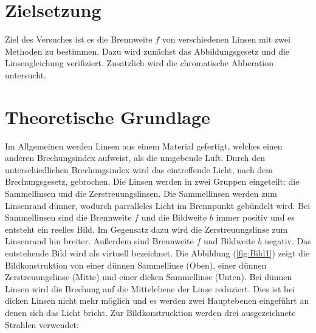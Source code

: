 \section{Zielsetzung}
Ziel des Versuches ist es die Brennweite $f$ von verschiedenen Linsen mit zwei Methoden zu bestimmen. Dazu wird zunächst das Abbildungsgesetz und die Linsengleichung verifiziert. Zusätzlich wird die chromatische Abberation untersucht.

\section{Theoretische Grundlage}
\begin{minipage}[T]{0.5\textwidth}
Im Allgemeinen werden Linsen aus einem Material gefertigt, welches einen anderen Brechungsindex aufweist, als die umgebende Luft. Durch den unterschiedlichen Brechungsindex wird das eintreffende Licht, nach dem Brechungsgesetz, gebrochen. Die Linsen werden in zwei Gruppen eingeteilt: die Sammellinsen und die Zerstreuungslinsen. Die Sammellinsen werden zum Linsenrand dünner, wodurch parralleles Licht im Brennpunkt gebündelt wird. Bei Sammellinsen sind die Brennweite $f$ und die Bildweite $b$ immer positiv und es entsteht ein reelles Bild. Im Gegensatz dazu wird die Zerstreuungslinse zum Linsenrand hin breiter. Außerdem sind Brennweite $f$ und Bildweite $b$ negativ. Das entstehende Bild wird als virtuell bezeichnet. Die Abbildung (\ref{fig:Bild1}) zeigt die Bildkonstruktion von einer dünnen Sammellinse (Oben), einer dünnen Zerstreuungslinse (Mitte) und einer dicken Sammellinse (Unten). Bei dünnen Linsen wird die Brechung auf die Mittelebene der Linse reduziert. Dies ist bei dicken Linsen nicht mehr möglich und es werden zwei Hauptebenen eingeführt an denen sich das Licht bricht. Zur Bildkonstrucktion werden drei ausgezeichnete Strahlen verwendet:
\end{minipage}
